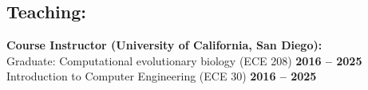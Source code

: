 \documentclass[margin,line,letterpaper]{resume}
\begin{document}
\begin{resume}



    \section{\mysidestyle Teaching:}

    \textbf{Course Instructor (University of California, San Diego):}\vspace{2mm}\\\vspace{1mm}%
     Graduate: Computational evolutionary biology (ECE 208)  \hfill \textbf{2016 -- 2025}\\
     Introduction to Computer Engineering  (ECE 30) \hfill \textbf{2016 -- 2025}


\end{resume}
\end{document}

